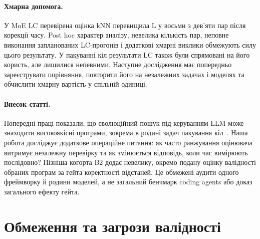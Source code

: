 \documentclass[11pt]{article}
\begin{document}
\paragraph{Хмарна допомога.} У MoE LC перевірена оцінка kNN перевищила L у восьми з дев'яти пар після корекції часу. Post hoc характер аналізу, невелика кількість пар, неповне виконання запланованих LC-прогонів і додаткові хмарні виклики обмежують силу цього результату. У пакуванні кіл результати LC також були спрямовані на його користь, але лишилися непевними. Наступне дослідження має попередньо зареєструвати порівняння, повторити його на незалежних задачах і моделях та обчислити хмарну вартість у спільній одиниці.

\paragraph{Внесок статті.} Попередні праці показали, що еволюційний пошук під керуванням LLM може знаходити високоякісні програми, зокрема в родині задач пакування кіл~\citep{romera2024funsearch,novikov2025alphaevolve,assumpcao2025codeevolve}. Наша робота досліджує додаткове операційне питання: як часто ранжування оцінювача витримує незалежну перевірку та як змінюється відповідь, коли час вимірюють послідовно? Пізніша когорта B2 додає невелику, окремо подану оцінку валідності обраних програм за гейта коректності відстаней. Це обмежені аудити одного фреймворку й родини моделей, а не загальний бенчмарк coding agents або доказ загального ефекту гейта.

\section{Обмеження та загрози валідності}\label{sec:limitations}
\end{document}
